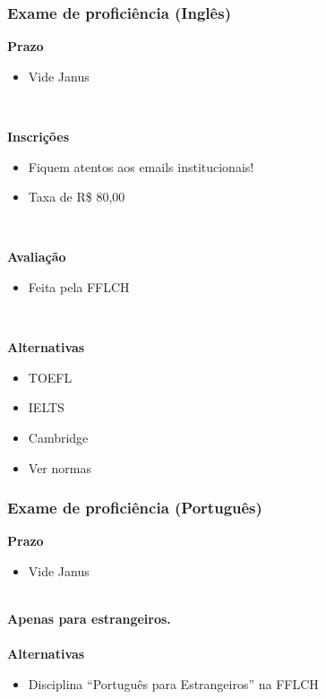 \documentclass{beamer}
\begin{document}
\begin{frame}
  \frametitle{Exame de proficiência (Inglês)}

  \textbf{Prazo}
  \begin{itemize}
    \item Vide Janus
  \end{itemize}~\\\pause

  \textbf{Inscrições}
  \begin{itemize}
    \item Fiquem atentos aos emails institucionais!
    \item Taxa de R\$ 80,00
  \end{itemize}~\\\pause

  \textbf{Avaliação}
  \begin{itemize}
    \item Feita pela FFLCH
  \end{itemize}~\\\pause

  \textbf{Alternativas}
  \begin{multicols}{2}
  \begin{itemize}
    \item TOEFL
    \item IELTS\columnbreak
    \item Cambridge
    \item Ver normas
  \end{itemize}
  \end{multicols}
\end{frame}

\begin{frame}
  \frametitle{Exame de proficiência (Português)}

  \textbf{Prazo}
  \begin{itemize}
    \item Vide Janus
  \end{itemize}~\\

  \textbf{Apenas para estrangeiros.}\\~\\

  \textbf{Alternativas}
  \begin{itemize}
    \item Disciplina ``Português para Estrangeiros'' na FFLCH
  \end{itemize}
\end{frame}
\end{document}
